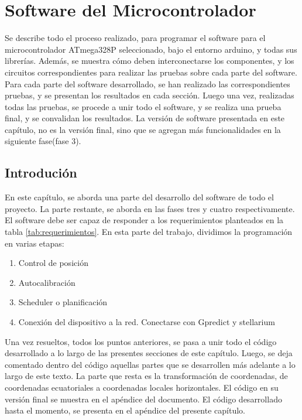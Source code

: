 \renewcommand{\chaptername}{Software del microcontrolador}
\graphicspath{{parte_2/soft_micro/}}
\chapter{Software del Microcontrolador} 
\begin{center}
	\begin{tcolorbox}[colback=gray!5!white, %
		colframe=gray!75!black,
		title= \center{\Large{Resumen}} ]
		Se describe todo el proceso realizado, para programar el software para el microcontrolador ATmega328P seleccionado, bajo el entorno arduino, y todas sus librerías. Además, se muestra cómo deben interconectarse los componentes, y los circuitos correspondientes para realizar las pruebas sobre cada parte del software. Para cada parte del software desarrollado, se han realizado las correspondientes pruebas, y se presentan los resultados en cada sección. Luego una vez, realizadas todas las pruebas, se procede a unir todo el software, y se realiza una prueba final, y se convalidan los resultados. La versión de software presentada en este capítulo, no es la versión final, sino que se agregan más funcionalidades en la siguiente fase(fase 3).   		 
 	\end{tcolorbox}
\end{center}    
\section{Introdución} 
	En este capítulo, se aborda una parte del desarrollo del software de todo el proyecto. La parte restante, se aborda en las fases tres y cuatro respectivamente. El software debe ser capaz de responder a los requerimientos planteados en la tabla \ref{tab:requerimientos}. En esta parte del trabajo, dividimos la programación en varias etapas:  	
	\begin{enumerate}
		\item Control de posición
		\item Autocalibración
		\item Scheduler o planificación 
		\item Conexión del dispositivo a la red. Conectarse con Gpredict y stellarium
	\end{enumerate}
	Una vez resueltos, todos los puntos anteriores, se pasa a unir todo el código desarrollado a lo largo de las presentes secciones de este capítulo. Luego, se deja comentado dentro del código aquellas partes que se desarrollen más adelante a lo largo de este texto. La parte que resta es la transformación de coordenadas, de coordenadas ecuatoriales a coordenadas locales horizontales.  El código en su versión final se muestra en el apéndice del documento. El código desarrollado hasta el momento, se presenta en el apéndice del presente capítulo.    

